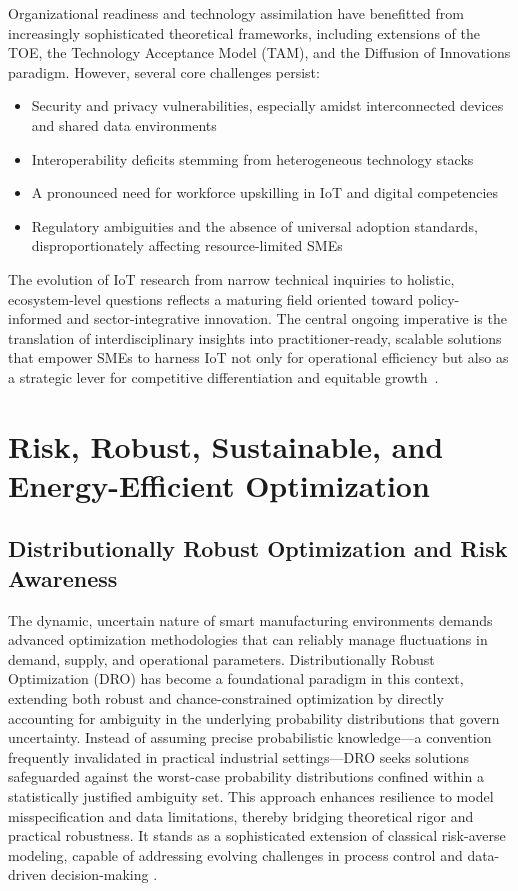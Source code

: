 Organizational readiness and technology assimilation have benefitted from increasingly sophisticated theoretical frameworks, including extensions of the TOE, the Technology Acceptance Model (TAM), and the Diffusion of Innovations paradigm. However, several core challenges persist:
\begin{itemize}
    \item Security and privacy vulnerabilities, especially amidst interconnected devices and shared data environments
    \item Interoperability deficits stemming from heterogeneous technology stacks
    \item A pronounced need for workforce upskilling in IoT and digital competencies
    \item Regulatory ambiguities and the absence of universal adoption standards, disproportionately affecting resource-limited SMEs
\end{itemize}

The evolution of IoT research from narrow technical inquiries to holistic, ecosystem-level questions reflects a maturing field oriented toward policy-informed and sector-integrative innovation. The central ongoing imperative is the translation of interdisciplinary insights into practitioner-ready, scalable solutions that empower SMEs to harness IoT not only for operational efficiency but also as a strategic lever for competitive differentiation and equitable growth~\cite{ref33}.

\section{Risk, Robust, Sustainable, and Energy-Efficient Optimization}

\subsection{Distributionally Robust Optimization and Risk Awareness}

The dynamic, uncertain nature of smart manufacturing environments demands advanced optimization methodologies that can reliably manage fluctuations in demand, supply, and operational parameters. Distributionally Robust Optimization (DRO) has become a foundational paradigm in this context, extending both robust and chance-constrained optimization by directly accounting for ambiguity in the underlying probability distributions that govern uncertainty. Instead of assuming precise probabilistic knowledge—a convention frequently invalidated in practical industrial settings—DRO seeks solutions safeguarded against the worst-case probability distributions confined within a statistically justified ambiguity set. This approach enhances resilience to model misspecification and data limitations, thereby bridging theoretical rigor and practical robustness. It stands as a sophisticated extension of classical risk-averse modeling, capable of addressing evolving challenges in process control and data-driven decision-making \cite{ref77}.


